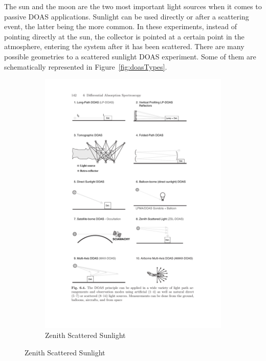 The sun and the moon are the two most important light sources when it
comes to passive \gls{DOAS} applications. Sunlight can be used directly
or after a scattering event, the latter being the more common. In these
experiments, instead of pointing directly at the sun, the collector is
pointed at a certain point in the atmosphere, entering the system after
it has been scattered. There are many possible geometries to a scattered
sunlight \gls{DOAS} experiment. Some of them are schematically
represented in Figure~\ref{fig:doasTypes}.

\begin{figure}[htpb]
    \centering
    \begin{subfigure}[b]{.475\textwidth}
        \centering
        \includegraphics[trim=10.8cm 10cm 4.5cm
        16.9cm, clip, width=\textwidth]{img/pdf/zenithMaxAMax.pdf}
        \caption{Zenith Scattered Sunlight}
        \label{fig:zsldoas}

\end{subfigure}
\end{figure}
